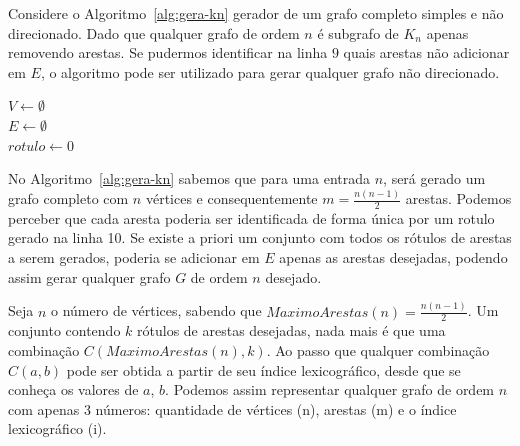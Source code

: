 Considere o Algoritmo~\ref{alg:gera-kn} gerador de um grafo completo simples e não direcionado.
Dado que qualquer grafo de ordem $n$ é subgrafo de $K_n$ apenas removendo arestas. 
Se pudermos identificar na linha $9$ quais arestas não adicionar em $E$, 
o algoritmo pode ser utilizado para gerar qualquer grafo não direcionado. 


\begin{algorithm2e}[H]
    \SetAlFnt{\tiny}
    \SetAlCapFnt{\small}
    \SetAlCapNameFnt{\small}
    \SetAlgoLined
    \DontPrintSemicolon
    \LinesNumbered
    \SetAlgoLined
    \BlankLine
    \BlankLine
    $V \gets \emptyset$ \\
    $E \gets \emptyset$ \\
    $rotulo \gets 0$ \\
\caption{$GeraK_n(n)$}
\label{alg:gera-kn}
\end{algorithm2e} 

No Algoritmo~\ref{alg:gera-kn} sabemos que para uma entrada $n$, será gerado um grafo completo com $n$ vértices e consequentemente $m=\frac{n(n-1)}{2}$ arestas.  Podemos perceber que cada aresta poderia ser identificada de forma única por um rotulo gerado na linha 10. Se existe a priori um conjunto com todos os rótulos de arestas a serem gerados, 
poderia se adicionar em $E$ apenas as arestas desejadas, podendo assim gerar qualquer grafo $G$ de ordem $n$ desejado.


Seja $n$ o número de vértices, sabendo que $MaximoArestas(n)=\frac{n(n-1)}{2}$. Um conjunto contendo $k$ rótulos de arestas desejadas, nada mais é que uma combinação $C(MaximoArestas(n),k)$. Ao passo que qualquer combinação $C(a,b)$ pode ser obtida a partir de seu índice lexicográfico, desde que se conheça os valores de $a$, $b$. Podemos assim representar qualquer grafo de ordem $n$ com apenas 3 números: quantidade de vértices (n), arestas (m) e o índice lexicográfico (i).


